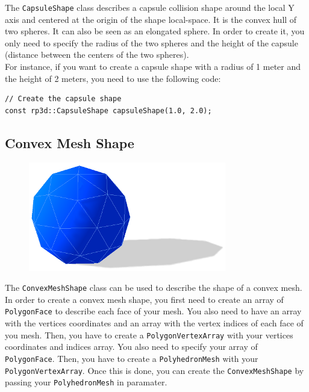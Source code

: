 \documentclass[a4paper,12pt]{article}
\begin{document}
    The \texttt{CapsuleShape} class describes a capsule collision shape around the local Y axis and centered at the origin of the shape local-space. It is the convex hull of two
    spheres. It can also be seen as an elongated sphere. In order to create it, you only need to specify the radius of the two spheres and the height of the
    capsule (distance between the centers of the two spheres).  \\

    For instance, if you want to create a capsule shape with a radius of 1 meter and the height of 2 meters, you need to use the following code: \\

    \begin{lstlisting}
// Create the capsule shape
const rp3d::CapsuleShape capsuleShape(1.0, 2.0);
  \end{lstlisting}

    \vspace{0.6cm}

    \subsection{Convex Mesh Shape}

    \begin{figure}[h]
        \centering
        \includegraphics{convexshape.png}
        \label{fig:convexshape}
    \end{figure}

    The \texttt{ConvexMeshShape} class can be used to describe the shape of a convex mesh. In order to create a convex mesh shape, you first need to create an array of \texttt{PolygonFace} to describe each face
    of your mesh. You also need to have an array with the vertices coordinates and an array with the vertex indices of each face of you mesh. Then, you have to create a \texttt{PolygonVertexArray} with your
    vertices coordinates and indices array. You also need to specify your array of \texttt{PolygonFace}. Then, you have to create a \texttt{PolyhedronMesh} with your \texttt{PolygonVertexArray}.
    Once this is done, you can create the \texttt{ConvexMeshShape} by passing your \texttt{PolyhedronMesh} in paramater. \\
\end{document}
